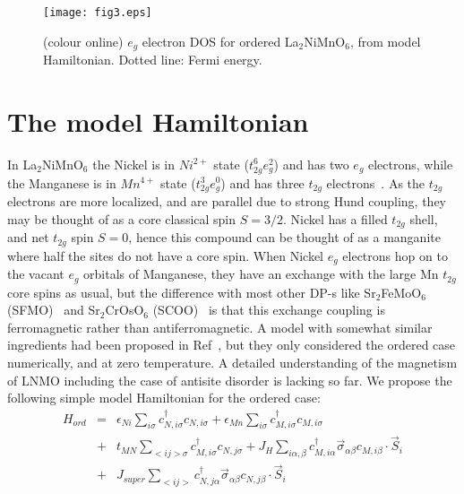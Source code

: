 \documentclass[english,aps,prb,twocolumn,showpacs]{revtex4-1}
\begin{document}
\begin{figure}
\texttt{[image: fig3.eps]} \\
\caption{(colour online) $e_{g}$ electron DOS for ordered La$_{2}$NiMnO$_{6}$, from model Hamiltonian. Dotted line: Fermi
 energy.}  
\label{DOS}
\end{figure}

\section{The model Hamiltonian}

In La$_{2}$NiMnO$_{6}$ the Nickel is in $Ni^{2+}$ state ($t_{2g}^{6}e_{g}^{2}$) and has two $e_{g}$ electrons, 
while the Manganese
 is in $Mn^{4+}$ state ($t_{2g}^{3}e_{g}^{0}$) and has three $t_{2g}$ electrons~\cite{AdvMat,debraj,Tanusri}.
  As the $t_{2g}$ electrons are more localized, and are
 parallel due to strong Hund coupling, they may be thought of as a core classical spin $S=3/2$. Nickel has
 a filled $t_{2g}$ shell, and net $t_{2g}$
 spin $S=0$, hence this compound can be thought of as a manganite where half the sites do not have a core spin.
  When Nickel $e_{g}$ electrons  hop on to the vacant $e_{g}$ orbitals of Manganese,
 they have an exchange with the 
 large Mn $t_{2g}$ core spins as usual, but the difference with most other DP-s
 like Sr$_{2}$FeMoO$_{6}$ (SFMO)~\cite{Millis} 
 and Sr$_{2}$CrOsO$_{6}$ (SCOO)~\cite{Sr2CrOsO6} is that this exchange coupling is
 ferromagnetic rather than antiferromagnetic.
  A model with somewhat similar ingredients had been proposed in Ref~\cite{Sanjeev},
  but they only considered the ordered case numerically, and at zero temperature.
  A detailed understanding of the magnetism of LNMO including the case of antisite disorder is lacking
  so far. We propose the following simple model Hamiltonian for the ordered case:
\begin{eqnarray}
H_{ord}&=&\epsilon_{Ni}\sum_{i\sigma}c_{N,i\sigma}^{\dagger}c_{N,i\sigma}+\epsilon_{Mn}\sum_{i\sigma}c_{M,i\sigma}^{\dagger}c_{M,i\sigma} \nonumber \\
 &+&t_{MN}\sum_{<ij>\sigma}c_{M,i\sigma}^{\dagger}c_{N,j\sigma}+J_{H}\sum_{i\alpha,\beta}c_{M,i\alpha}^{\dagger}\vec{\sigma}_{\alpha\beta}
c_{M,i\beta}\cdot \vec{S}_{i} \nonumber \\
 &+&J_{super}\sum_{<ij>} c_{N,j\alpha}^{\dagger}\vec{\sigma}_{\alpha\beta}c_{N,j\beta}\cdot \vec{S}_{i} 
\label{finiteJH}
\end{eqnarray}
\end{document}
